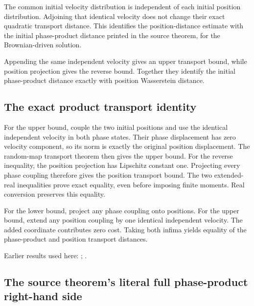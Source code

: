 \documentclass[11pt,a4paper]{report}
\begin{document}
The common initial velocity distribution is independent of each initial position distribution. Adjoining that identical velocity does not change their exact quadratic transport distance. This identifies the position-distance estimate with the initial phase-product distance printed in the source theorem, for the Brownian-driven solution.



Appending the same independent velocity gives an upper transport bound, while position projection gives the reverse bound. Together they identify the initial phase-product distance exactly with position Wasserstein distance.

\subsection{\texorpdfstring{The exact product transport identity}{The exact product transport identity}}
\label{report-step-KineticLangevin-PhaseInitialTransport-lean-1}


For the upper bound, couple the two initial positions and use the identical independent velocity in both phase states. Their phase displacement has zero velocity component, so its norm is exactly the original position displacement. The random-map transport theorem then gives the upper bound. For the reverse inequality, the position projection has Lipschitz constant one. Projecting every phase coupling therefore gives the position transport bound. The two extended-real inequalities prove exact equality, even before imposing finite moments. Real conversion preserves this equality.



For the lower bound, project any phase coupling onto positions. For the upper bound, extend any position coupling by one identical independent velocity. The added coordinate contributes zero cost. Taking both infima yields equality of the phase-product and position transport distances.



Earlier results used here: \cite[Section~3.17.3]{LangevinLean2026ULASC}; \cite[Section~3.17.4]{LangevinLean2026ULASC}.
\subsection{\texorpdfstring{The source theorem’s literal full phase-product right-hand side}{The source theorem’s literal full phase-product right-hand side}}
\label{report-step-KineticLangevin-PhaseInitialTransport-lean-2}
\end{document}
